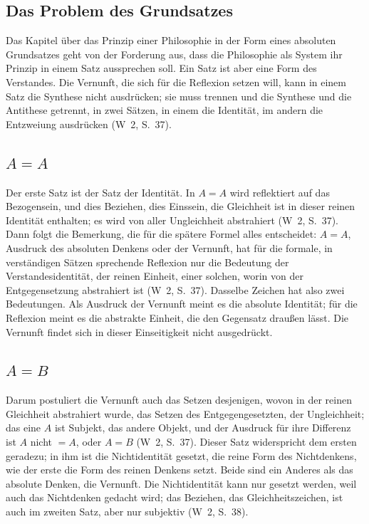 \documentclass[11pt,a4paper]{article}
\newcommand{\Werke}[1]{(W~2, S.~#1)}
\begin{document}
\subsection{Das Problem des Grundsatzes}

Das Kapitel über das Prinzip einer Philosophie in der Form eines absoluten Grundsatzes geht von der Forderung aus, dass die Philosophie als System ihr Prinzip in einem Satz aussprechen soll. Ein Satz ist aber eine Form des Verstandes. Die Vernunft, die sich für die Reflexion setzen will, kann in einem Satz die Synthese nicht ausdrücken; sie muss trennen und \glqq die Synthese und die Antithese getrennt, in zwei Sätzen, in einem die Identität, im andern die Entzweiung ausdrücken\grqq{} \Werke{37}.

\subsection{$A = A$}

Der erste Satz ist der Satz der Identität. In $A = A$ \glqq wird reflektiert auf das Bezogensein, und dies Beziehen, dies Einssein, die Gleichheit ist in dieser reinen Identität enthalten; es wird von aller Ungleichheit abstrahiert\grqq{} \Werke{37}. Dann folgt die Bemerkung, die für die spätere Formel alles entscheidet: $A = A$, \glqq Ausdruck des absoluten Denkens oder der Vernunft\grqq{}, hat \glqq für die formale, in verständigen Sätzen sprechende Reflexion nur die Bedeutung der Verstandesidentität, der reinen Einheit\grqq{}, einer solchen, \glqq worin von der Entgegensetzung abstrahiert ist\grqq{} \Werke{37}. Dasselbe Zeichen hat also zwei Bedeutungen. Als Ausdruck der Vernunft meint es die absolute Identität; für die Reflexion meint es die abstrakte Einheit, die den Gegensatz draußen lässt. Die Vernunft findet sich in dieser Einseitigkeit nicht ausgedrückt.

\subsection{$A = B$}

Darum postuliert die Vernunft \glqq auch das Setzen desjenigen, wovon in der reinen Gleichheit abstrahiert wurde, das Setzen des Entgegengesetzten, der Ungleichheit; das eine $A$ ist Subjekt, das andere Objekt, und der Ausdruck für ihre Differenz ist $A$ nicht $= A$, oder $A = B$\grqq{} \Werke{37}. Dieser Satz widerspricht dem ersten geradezu; in ihm ist die Nichtidentität gesetzt, \glqq die reine Form des Nichtdenkens\grqq{}, wie der erste die Form des reinen Denkens setzt. Beide sind \glqq ein Anderes als das absolute Denken, die Vernunft\grqq{}. Die Nichtidentität kann nur gesetzt werden, weil auch das Nichtdenken gedacht wird; das Beziehen, das Gleichheitszeichen, ist auch im zweiten Satz, aber nur subjektiv \Werke{38}.
\end{document}
